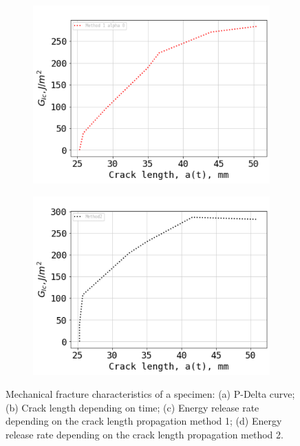 \documentclass[3p,times,procedia]{elsarticle}
\begin{document}
\begin{figure}[t]
	\\
	\begin{subfigure}[b]{0.475\textwidth}
		\centering
		\includegraphics[width=.9\textwidth]{Fig2c}
		\caption{}
		\label{fig:image3}
	\end{subfigure}
	\hfill
	\begin{subfigure}[b]{0.475\textwidth}
		\centering
		\includegraphics[width=.9\textwidth]{Fig2d}
		\caption{}
		\label{fig:image4}
	\end{subfigure}
	\caption{Mechanical fracture characteristics of a specimen: (a) P-Delta curve; (b) Crack length depending on time; (c) Energy release rate depending on the crack length propagation method 1; (d) Energy release rate depending on the crack length propagation method 2.}
	\label{fig:images}
\end{figure}
\end{document}
